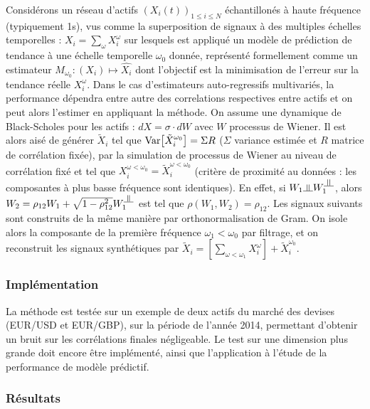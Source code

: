 Considérons un réseau d'actifs $(X_i(t))_{1\leq i \leq N}$ échantillonés à haute fréquence (typiquement 1s), vus comme la superposition de signaux à des multiples échelles temporelles : $X_i=\sum_{\omega}{X_i^{\omega}}$ sur lesquels est appliqué un modèle de prédiction de tendance à une échelle temporelle $\omega_0$ donnée, représenté formellement comme un estimateur $M_{\omega_0} : (X_i) \mapsto \hat{X_i}$ dont l'objectif est la minimisation de l'erreur sur la tendance réelle $X_i^{\omega}$. Dans le cas d'estimateurs auto-regressifs multivariés, la performance dépendra entre autre des correlations respectives entre actifs et on peut alors l'estimer en appliquant la méthode. On assume une dynamique de Black-Scholes pour les actifs : $dX = \sigma\cdot dW$ avec $W$ processus de Wiener. Il est alors aisé de générer $\tilde{X}_i$ tel que $\operatorname{Var}\!\left[\tilde{X}_i^{\omega_0}\right]=\Sigma R$ ($\Sigma$ variance estimée et $R$ matrice de corrélation fixée), par la simulation de processus de Wiener au niveau de corrélation fixé et tel que $X_i^{\omega < \omega_0} = \tilde{X}_i^{\omega < \omega_0}$ (critère de proximité au données : les composantes à plus basse fréquence sont identiques). En effet, si $W_1 \indep W_1^{\indep}$, alors $W_2 = \rho_{12}W_1 + \sqrt{1-\rho_{12}^2}W_1^{\indep}$ est tel que $\rho(W_1,W_2)=\rho_{12}$. Les signaux suivants sont construits de la même manière par orthonormalisation de Gram. On isole alors la composante de la première fréquence $\omega_1 < \omega_0$ par filtrage, et on reconstruit les signaux synthétiques par $\tilde{X}_i = [\sum_{\omega<\omega_1}X_i^{\omega}]+\tilde{X}_i^{\omega_0}$.


\subsubsection{Implémentation}

La méthode est testée sur un exemple de deux actifs du marché des devises (EUR/USD et EUR/GBP), sur la période de l'année 2014, permettant d'obtenir un bruit sur les corrélations finales négligeable. Le test sur une dimension plus grande doit encore être implémenté, ainsi que l'application à l'étude de la performance de modèle prédictif.


\subsubsection{Résultats}






